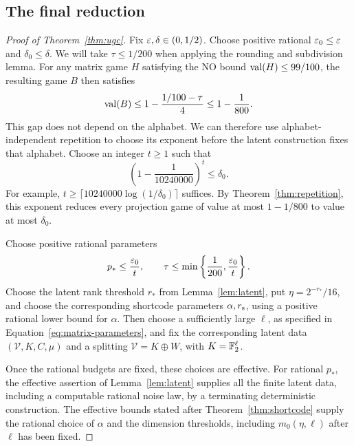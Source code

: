 \subsection{The final reduction}

\begin{proof}[Proof of Theorem~\ref{thm:ugc}]
Fix $\varepsilon,\delta\in(0,1/2)$.  Choose positive rational
$\varepsilon_0\le\varepsilon$ and $\delta_0\le\delta$.  We will take
$\tau\le1/200$ when applying the rounding and subdivision lemma.
For any matrix game $H$ satisfying the NO bound
$\operatorname{val}(H)\le99/100$, the resulting game $B$ then satisfies
\begin{equation}
 \operatorname{val}(B)\le1-\frac{1/100-\tau}{4}\le1-\frac1{800}.
 \label{eq:post-subdivision-gap}
\end{equation}
This gap does not depend on the alphabet.  We can therefore use
alphabet-independent repetition to choose its exponent before the
latent construction fixes that alphabet.  Choose an integer $t\ge1$
such that
\begin{equation}
 \left(1-\frac1{10240000}\right)^t\le\delta_0.
 \label{eq:final-repetition-gap}
\end{equation}
For example, $t\ge\lceil10240000\log(1/\delta_0)\rceil$ suffices.
By Theorem~\ref{thm:repetition}, this exponent reduces every projection
game of value at most $1-1/800$ to value at most $\delta_0$.

Choose positive rational parameters
\begin{equation}
 p_*\le\frac{\varepsilon_0}{t},\qquad
 \tau\le\min\left\{\frac1{200},\frac{\varepsilon_0}{t}\right\}.
 \label{eq:final-errors}
\end{equation}
Choose the latent rank threshold $r_*$ from Lemma~\ref{lem:latent},
put $\eta=2^{-r_*}/16$, and choose the corresponding shortcode
parameters $\alpha,r_{\rm s}$, using a positive rational lower bound
for $\alpha$.  Then choose a sufficiently large $\ell$, as specified
in Equation~\eqref{eq:matrix-parameters}, and fix the corresponding
latent data $(\mathcal V,K,C,\mu)$ and a splitting
$\mathcal V=K\oplus W$, with $K=\mathbb F_2^\ell$.

Once the rational budgets are fixed, these choices are effective.
For rational $p_*$, the effective assertion of Lemma~\ref{lem:latent}
supplies all the finite latent data, including a computable rational
noise law, by a terminating deterministic construction.  The effective bounds stated after
Theorem~\ref{thm:shortcode} supply the rational choice of $\alpha$ and
the dimension thresholds, including $m_0(\eta,\ell)$ after $\ell$ has
been fixed.


\end{proof}
